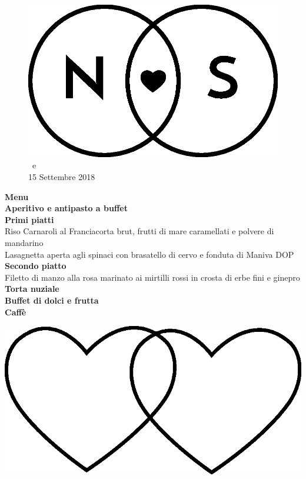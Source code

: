 \documentclass[11pt]{book}
\begin{document}
\begin{center}
\begin{figure}
\centering
\includegraphics[scale=0.23]{img/Logo_piccolo.eps}
\vfill
\LARGE\NSposo \ e \NSposa\\
\small15 Settembre 2018\\
\end{figure}
\vspace*{0mm}
\Huge \textbf{Menu}\\
\hfill\break
\normalsize\textbf{Aperitivo e antipasto a buffet}\\
\hfill\break
\textbf{Primi piatti}\\
Riso Carnaroli al Franciacorta brut, frutti di mare caramellati e polvere di mandarino\\
\hfill\break
Lasagnetta aperta agli spinaci con brasatello di cervo e fonduta di Maniva DOP\\
\hfill\break
\textbf{Secondo piatto}\\
Filetto di manzo alla rosa marinato ai mirtilli rossi in crosta di erbe fini e ginepro\\
\hfill\break
\textbf{Torta nuziale}\\
\textbf{Buffet di dolci e frutta}\\
\textbf{Caffè}\\

\vfill

\begin{center}
\includegraphics[scale=0.1]{img/cuori_venn.eps}
\end{center}

\vfill

\end{center}
\end{document}
